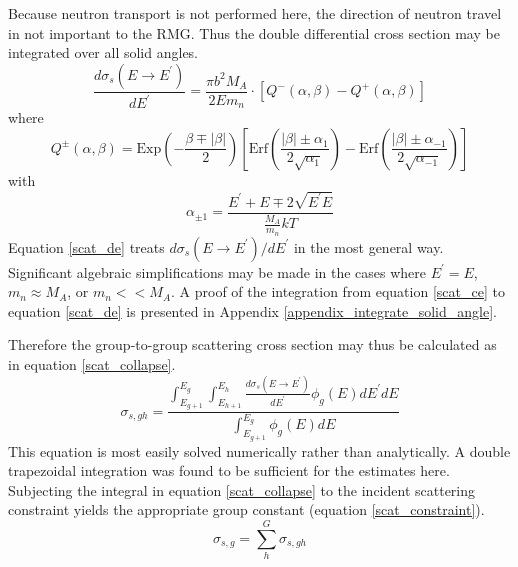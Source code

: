 Because neutron transport is not performed here, the direction of neutron travel in not
important to the RMG. Thus the double differential cross section may be integrated over all solid angles.
\begin{equation}
\label{scat_de}
\frac{d\sigma_s(E\to E^\prime)}{dE^\prime} = \frac{\pi b^2 M_A}{2Em_n} \cdot 
            \left[Q^-(\alpha, \beta) - Q^+(\alpha, \beta)\right]
\end{equation}
where 
\begin{equation}
\label{scat_q}
Q^\pm(\alpha, \beta) = \mbox{Exp}\left(-\frac{\beta \mp |\beta|}{2}\right) 
                       \left[\mbox{Erf}\left(\frac{|\beta| \pm \alpha_1}{2\sqrt{\alpha_1}}\right) - 
                             \mbox{Erf}\left(\frac{|\beta| \pm \alpha_{-1}}{2\sqrt{\alpha_{-1}}}\right)\right]
\end{equation}
with 
\begin{equation}
\label{scat_alpha_pm}
\alpha_{\pm 1} = \frac{E^\prime + E \mp 2\sqrt{E^\prime E}}{\frac{M_A}{m_n}kT}
\end{equation}
Equation \ref{scat_de} treats $d\sigma_s(E\to E^\prime)/dE^\prime$ in the most general way.  
Significant algebraic simplifications may be made in the cases where $E^\prime = E$, $m_n \approx M_A$, 
or $m_n << M_A$.  A proof of the integration from equation \ref{scat_ce} to equation \ref{scat_de} is 
presented in Appendix \ref{appendix_integrate_solid_angle}.


Therefore the group-to-group scattering cross section may thus be calculated as in equation \ref{scat_collapse}.
\begin{equation}
\label{scat_collapse}
\sigma_{s,gh} = \frac{\int_{E_{g+1}}^{E_g} \int_{E_{h+1}}^{E_h} \frac{d\sigma_s(E\to E^\prime)}{dE^\prime}  \phi_g(E) dE^\prime dE}
                     {\int_{E_{g+1}}^{E_g} \phi_g(E) dE}
\end{equation}
This equation is most easily solved numerically rather than analytically.
A double trapezoidal integration was found to be sufficient for the estimates here.
Subjecting the integral in equation \ref{scat_collapse} 
to the incident scattering constraint yields the appropriate group constant (equation \ref{scat_constraint}).
\begin{equation}
\label{scat_constraint}
\sigma_{s,g} = \sum_h^G \sigma_{s,gh}
\end{equation}






